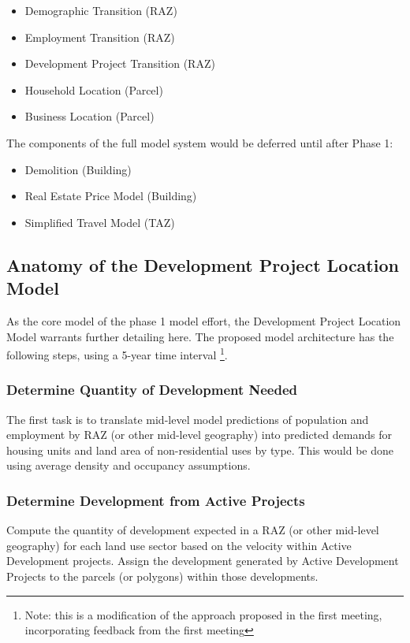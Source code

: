 \begin{itemize}
\item Demographic Transition (RAZ)
\item Employment Transition (RAZ)
\item Development Project Transition (RAZ)
\item Household Location (Parcel)
\item Business Location (Parcel)
\end{itemize}

The components of the full model system would be deferred until after Phase 1:

\begin{itemize}
\item Demolition (Building)
\item Real Estate Price Model (Building)
\item Simplified Travel Model (TAZ)
\end{itemize}


\subsection{Anatomy of the Development Project Location Model}
As the core model of the phase 1 model effort, the Development Project Location Model warrants
further detailing here.  The proposed model architecture has the following steps, using a 5-year time interval \footnote{Note: this is a modification of the approach proposed in the first meeting, 
incorporating feedback from the first meeting}.

\subsubsection{Determine Quantity of Development Needed}

The first task is to translate mid-level model predictions of population and employment by RAZ (or
other mid-level geography) into predicted demands for housing units and land area of non-residential
uses by type. This would be done using average density and occupancy assumptions.

\subsubsection{Determine Development from Active Projects}

Compute the quantity of development expected in a RAZ (or other mid-level geography) for each land use
sector based on the velocity within Active Development projects. Assign the development generated 
by Active Development Projects to the parcels (or polygons) within those developments.

